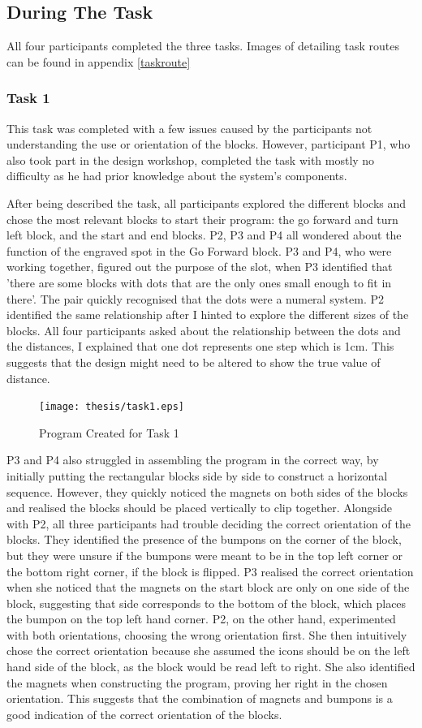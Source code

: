 \documentclass[oneside,%
                    author={Malak Hajji},
                    degree={BSc},
                    title={Designing An Accessible Ozobot Programming Platform for Students},
                  subtitle={With Mixed Visual Abilities}]{dissertation}
\begin{document}
\subsection{During The Task}
All four participants completed the three tasks. Images of detailing task routes can be found in appendix \ref{taskroute}
\subsubsection{Task 1}
This task was completed with a few issues caused by the participants not understanding the use or orientation of the blocks. However, participant P1, who also took part in the design workshop, completed the task with mostly no difficulty as he had prior knowledge about the system's components.

After being described the task, all participants explored the different blocks and chose the most relevant blocks to start their program: the go forward and turn left block, and the start and end blocks. 
P2, P3 and P4 all wondered about the function of the engraved spot in the Go Forward block. P3 and P4, who were working together, figured out the purpose of the slot, when P3 identified that 'there are some blocks with dots that are the only ones small enough to fit in there'. The pair quickly recognised that the dots were a numeral system. P2 identified the same relationship after I hinted to explore the different sizes of the blocks. All four participants asked about the relationship between the dots and the distances, I explained that one dot represents one step which is 1cm. This suggests that the design might need to be altered to show the true value of distance.
\FloatBarrier
\begin{figure}[h]
    \centering
    \texttt{[image: thesis/task1.eps]}
    \caption{Program Created for Task 1}
    \label{fig-task1}
\end{figure}
\FloatBarrier
P3 and P4 also struggled in assembling the program in the correct way, by initially putting the rectangular blocks side by side to construct a horizontal sequence. However, they quickly noticed the magnets on both sides of the blocks and realised the blocks should be placed vertically to clip together. Alongside with P2, all three participants had trouble deciding the correct orientation of the blocks. They identified the presence of the bumpons on the corner of the block, but they were unsure if the bumpons were meant to be in the top left corner or the bottom right corner, if the block is flipped. P3 realised the correct orientation when she noticed that the magnets on the start block are only on one side of the block, suggesting that side corresponds to the bottom of the block, which places the bumpon on the top left hand corner. P2, on the other hand, experimented with both orientations, choosing the wrong orientation first. She then intuitively chose the correct orientation because she assumed the icons should be on the left hand side of the block, as the block would be read left to right. She also identified the magnets when constructing the program, proving her right in the chosen orientation. This suggests that the combination of magnets and bumpons is a good indication of the correct orientation of the blocks. 
\end{document}
